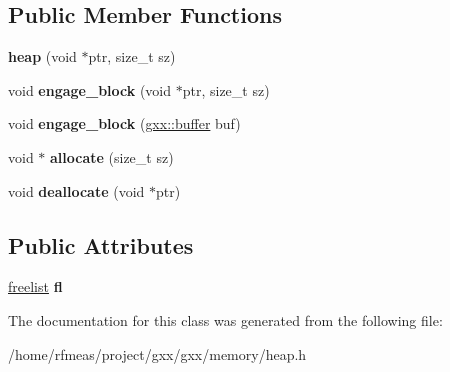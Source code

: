 \subsection*{Public Member Functions}
\begin{DoxyCompactItemize}
\item 
{\bfseries heap} (void $\ast$ptr, size\+\_\+t sz)\hypertarget{classgxx_1_1memory_1_1heap_a0a4f3b468b22a2af98463f1eae1aa1d0}{}\label{classgxx_1_1memory_1_1heap_a0a4f3b468b22a2af98463f1eae1aa1d0}

\item 
void {\bfseries engage\+\_\+block} (void $\ast$ptr, size\+\_\+t sz)\hypertarget{classgxx_1_1memory_1_1heap_a09d94b4b71db2a4ebbb6fe8dd62b57eb}{}\label{classgxx_1_1memory_1_1heap_a09d94b4b71db2a4ebbb6fe8dd62b57eb}

\item 
void {\bfseries engage\+\_\+block} (\hyperlink{classgxx_1_1buffer}{gxx\+::buffer} buf)\hypertarget{classgxx_1_1memory_1_1heap_a1a56d4f0bd315d2d6bb7b676e40885a7}{}\label{classgxx_1_1memory_1_1heap_a1a56d4f0bd315d2d6bb7b676e40885a7}

\item 
void $\ast$ {\bfseries allocate} (size\+\_\+t sz)\hypertarget{classgxx_1_1memory_1_1heap_ae9164b3dd16fc7866777903e69e00e1e}{}\label{classgxx_1_1memory_1_1heap_ae9164b3dd16fc7866777903e69e00e1e}

\item 
void {\bfseries deallocate} (void $\ast$ptr)\hypertarget{classgxx_1_1memory_1_1heap_aa77eb9a99eccf590f1a3243cc09badf3}{}\label{classgxx_1_1memory_1_1heap_aa77eb9a99eccf590f1a3243cc09badf3}

\end{DoxyCompactItemize}
\subsection*{Public Attributes}
\begin{DoxyCompactItemize}
\item 
\hyperlink{classgxx_1_1dlist}{freelist} {\bfseries fl}\hypertarget{classgxx_1_1memory_1_1heap_a56e6de5d1b052f01ff5425ebec5a81ff}{}\label{classgxx_1_1memory_1_1heap_a56e6de5d1b052f01ff5425ebec5a81ff}

\end{DoxyCompactItemize}


The documentation for this class was generated from the following file\+:\begin{DoxyCompactItemize}
\item 
/home/rfmeas/project/gxx/gxx/memory/heap.\+h\end{DoxyCompactItemize}
